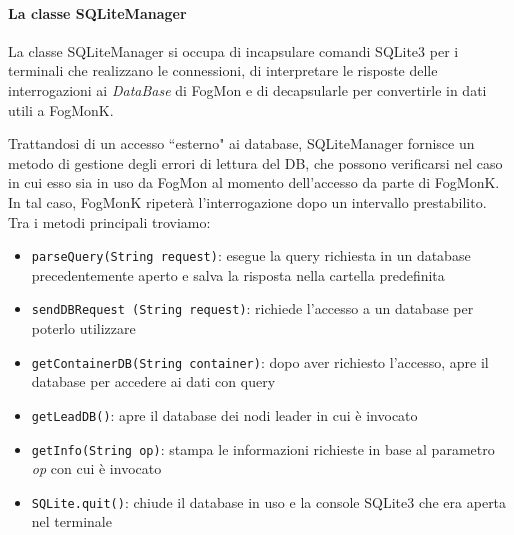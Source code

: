         \paragraph{La classe SQLiteManager}\mbox{}\newline
        La classe SQLiteManager si occupa di incapsulare comandi SQLite3 per i terminali che realizzano le connessioni, di interpretare le risposte delle interrogazioni ai \textit{DataBase} di FogMon e di decapsularle per convertirle in dati utili a FogMonK.
        
        Trattandosi di un accesso ``esterno" ai database, SQLiteManager fornisce un metodo di gestione degli errori di lettura del DB, che possono verificarsi nel caso in cui esso sia in uso da FogMon al momento dell'accesso da parte di FogMonK. In tal caso, FogMonK ripeterà l'interrogazione dopo un intervallo prestabilito. Tra i metodi principali troviamo:
        \begin{itemize}
            \item \texttt{parseQuery(String request)}: esegue la query richiesta in un database precedentemente aperto e salva la risposta nella cartella predefinita
            \item \texttt{sendDBRequest (String request)}: richiede l'accesso a un database per poterlo utilizzare
            \item \texttt{getContainerDB(String container)}: dopo aver richiesto l'accesso, apre il database per accedere ai dati con query
            \item \texttt{getLeadDB()}: apre il database dei nodi leader in cui è invocato
            \item \texttt{getInfo(String op)}: stampa le informazioni richieste in base al parametro \textit{op} con cui è invocato
            \item \texttt {SQLite.quit()}: chiude il database in uso e la console SQLite3 che era aperta nel terminale
        \end{itemize}










